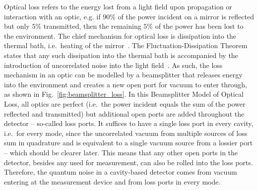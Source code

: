 Optical loss refers to the energy lost from a light field upon propagation or interaction with an optic, e.g. if $90\%$ of the power incident on a mirror is reflected but only $5\%$ transmitted, then the remaining $5\%$ of the power has been lost to the environment. The chief mechanism for optical loss is dissipation into the thermal bath, i.e.\ heating of the mirror~\cite{}. The Fluctuation-Dissipation Theorem states that any such dissipation into the thermal bath is accompanied by the introduction of uncorrelated noise into the light field~\cite{}. As such, the loss mechanism in an optic can be modelled by a beamsplitter that releases energy into the environment and creates a new open port for vacuum to enter through, as shown in Fig.~\ref{fig:beamsplitter_loss}. In this Beamsplitter Model of Optical Loss, all optics are perfect (i.e.\ the power incident equals the sum of the power reflected and transmitted) but additional open ports are added throughout the detector -- so-called loss ports. It suffices to have a single loss port in every cavity, i.e.\ for every mode, since the uncorrelated vacuum from multiple sources of loss sum in quadrature and is equivalent to a single vacuum source from a lossier port -- which should be clearer later. %
This means that any other open ports in the detector, besides any used for measurement, can also be rolled into the loss ports. Therefore, the quantum noise in a cavity-based detector comes from vacuum entering at the measurement device and from loss ports in every mode.

